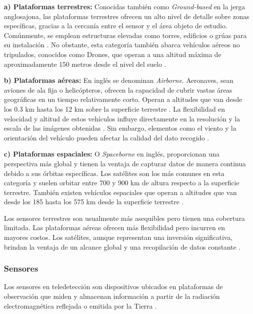 \textbf{a) Plataformas terrestres:} Conocidas también como \textit{Ground-based} en la jerga anglosajona, las plataformas terrestres ofrecen un alto nivel de detalle sobre zonas específicas, gracias a la cercanía entre el sensor y el área objeto de estudio. Comúnmente, se emplean estructuras elevadas como torres, edificios o grúas para su instalación \cite{canada2007fundamentals}. No obstante, esta categoría también abarca vehículos aéreos no tripulados, conocidos como Drones, que operan a una altitud máxima de aproximadamente 150 metros desde el nivel del suelo \cite{yamazaki2016remote}.

\textbf{b) Plataformas aéreas:} En inglés se denominan \textit{Airborne}. Aeronaves, sean aviones de ala fija o helicópteros, ofrecen la capacidad de cubrir vastas áreas geográficas en un tiempo relativamente corto. Operan a altitudes que van desde los 0.3 km hasta los 12 km sobre la superficie terrestre \cite{tempfli2009principles, yamazaki2016remote}. La flexibilidad en velocidad y altitud de estos vehículos influye directamente en la resolución y la escala de las imágenes obtenidas \cite{canada2007fundamentals}. Sin embargo, elementos como el viento y la orientación del vehículo pueden afectar la calidad del dato recogido \cite{tempfli2009principles}.

\textbf{c) Plataformas espaciales:} O \textit{Spaceborne} en inglés, proporcionan una perspectiva más global y tienen la ventaja de capturar datos de manera continua debido a sus órbitas específicas. Los satélites son los más comunes en esta categoría y suelen orbitar entre 700 y 900 km de altura respecto a la superficie terrestre. También existen vehículos espaciales que operan a altitudes que van desde los 185 hasta los 575 km desde la superficie terrestre \cite{tempfli2009principles}.

Los sensores terrestres son usualmente más asequibles pero tienen una cobertura limitada. Las plataformas aéreas ofrecen más flexibilidad pero incurren en mayores costos. Los satélites, aunque representan una inversión significativa, brindan la ventaja de un alcance global y una recopilación de datos constante \cite{canada2007fundamentals}.

\subsubsection{Sensores}

Los sensores en teledetección son dispositivos ubicados en plataformas de observación que miden y almacenan información a partir de la radiación electromagnética reflejada o emitida por la Tierra \cite{tempfli2009principles}.

